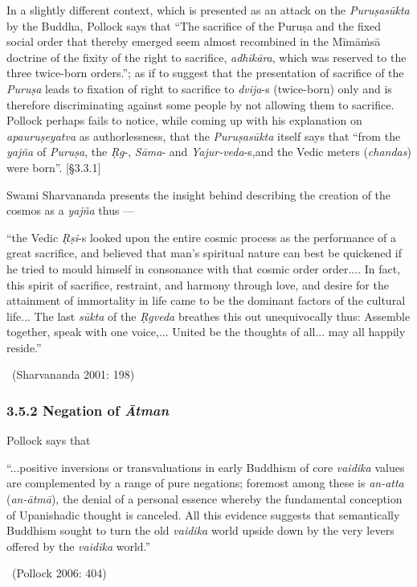In a slightly different context, which is presented as an attack on the \textit{Puruṣasūkta} by the Buddha, Pollock says that “The sacrifice of the Puruṣa and the fixed social order that thereby emerged seem almost recombined in the Mīmāṁsā doctrine of the fixity of the right to sacrifice, \textit{adhikāra}, which was reserved to the three twice-born orders.”; as if to suggest that the presentation of sacrifice of the \textit{Puruṣa} leads to fixation of right to sacrifice to \textit{dvija}-s (twice-born) only and is therefore discriminating against some people by not allowing them to sacrifice. Pollock perhaps fails to notice, while coming up with his explanation on \textit{apauruṣeyatva} as authorlessness, that the \textit{Puruṣasūkta} itself says that “from the \textit{yajña} of \textit{Puruṣa}, the \textit{Ṛg}-, \textit{Sāma}- and \textit{Yajur-veda}-s,\break and the Vedic meters (\textit{chandas}) were born”. [§3.3.1]

Swami Sharvananda presents the insight behind describing the creation of the cosmos as a \textit{yajña }thus —

\begin{myquote}
“the Vedic \textit{Ṛṣi}-s looked upon the entire cosmic process as the performance of a great sacrifice, and believed that man’s spiritual nature can best be quickened if he tried to mould himself in consonance with that cosmic order order.... In fact, this spirit of sacrifice, restraint, and harmony through love, and desire for the attainment of immortality in life came to be the dominant factors of the cultural life... The last \textit{sūkta} of the \textit{Ṛgveda} breathes this out unequivocally thus: Assemble together, speak with one voice,... United be the thoughts of all... may all happily reside.” 

~\hfill (Sharvananda 2001: 198)
\end{myquote}


\subsubsection*{3.5.2 Negation of \textit{Ātman}}

Pollock says that

\begin{myquote}
“...positive inversions or transvaluations in early Buddhism of core \textit{vaidika} values are complemented by a range of pure negations; foremost among these is \textit{an-atta} (\textit{an-ātmā}), the denial of a personal essence whereby the fundamental conception of Upanishadic thought is canceled. All this evidence suggests that semantically Buddhism sought to turn the old \textit{vaidika} world upside down by the very levers offered by the \textit{vaidika} world.” 

~\hfill (Pollock 2006: 404)
\end{myquote}

